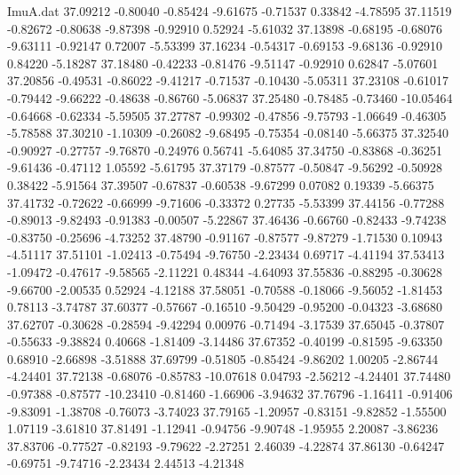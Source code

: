\begin{filecontents}{ImuA.dat}
  37.09212   -0.80040   -0.85424   -9.61675   -0.71537    0.33842   -4.78595
  37.11519   -0.82672   -0.80638   -9.87398   -0.92910    0.52924   -5.61032
  37.13898   -0.68195   -0.68076   -9.63111   -0.92147    0.72007   -5.53399
  37.16234   -0.54317   -0.69153   -9.68136   -0.92910    0.84220   -5.18287
  37.18480   -0.42233   -0.81476   -9.51147   -0.92910    0.62847   -5.07601
  37.20856   -0.49531   -0.86022   -9.41217   -0.71537   -0.10430   -5.05311
  37.23108   -0.61017   -0.79442   -9.66222   -0.48638   -0.86760   -5.06837
  37.25480   -0.78485   -0.73460  -10.05464   -0.64668   -0.62334   -5.59505
  37.27787   -0.99302   -0.47856   -9.75793   -1.06649   -0.46305   -5.78588
  37.30210   -1.10309   -0.26082   -9.68495   -0.75354   -0.08140   -5.66375
  37.32540   -0.90927   -0.27757   -9.76870   -0.24976    0.56741   -5.64085
  37.34750   -0.83868   -0.36251   -9.61436   -0.47112    1.05592   -5.61795
  37.37179   -0.87577   -0.50847   -9.56292   -0.50928    0.38422   -5.91564
  37.39507   -0.67837   -0.60538   -9.67299    0.07082    0.19339   -5.66375
  37.41732   -0.72622   -0.66999   -9.71606   -0.33372    0.27735   -5.53399
  37.44156   -0.77288   -0.89013   -9.82493   -0.91383   -0.00507   -5.22867
  37.46436   -0.66760   -0.82433   -9.74238   -0.83750   -0.25696   -4.73252
  37.48790   -0.91167   -0.87577   -9.87279   -1.71530    0.10943   -4.51117
  37.51101   -1.02413   -0.75494   -9.76750   -2.23434    0.69717   -4.41194
  37.53413   -1.09472   -0.47617   -9.58565   -2.11221    0.48344   -4.64093
  37.55836   -0.88295   -0.30628   -9.66700   -2.00535    0.52924   -4.12188
  37.58051   -0.70588   -0.18066   -9.56052   -1.81453    0.78113   -3.74787
  37.60377   -0.57667   -0.16510   -9.50429   -0.95200   -0.04323   -3.68680
  37.62707   -0.30628   -0.28594   -9.42294    0.00976   -0.71494   -3.17539
  37.65045   -0.37807   -0.55633   -9.38824    0.40668   -1.81409   -3.14486
  37.67352   -0.40199   -0.81595   -9.63350    0.68910   -2.66898   -3.51888
  37.69799   -0.51805   -0.85424   -9.86202    1.00205   -2.86744   -4.24401
  37.72138   -0.68076   -0.85783  -10.07618    0.04793   -2.56212   -4.24401
  37.74480   -0.97388   -0.87577  -10.23410   -0.81460   -1.66906   -3.94632
  37.76796   -1.16411   -0.91406   -9.83091   -1.38708   -0.76073   -3.74023
  37.79165   -1.20957   -0.83151   -9.82852   -1.55500    1.07119   -3.61810
  37.81491   -1.12941   -0.94756   -9.90748   -1.95955    2.20087   -3.86236
  37.83706   -0.77527   -0.82193   -9.79622   -2.27251    2.46039   -4.22874
  37.86130   -0.64247   -0.69751   -9.74716   -2.23434    2.44513   -4.21348

\end{filecontents}
